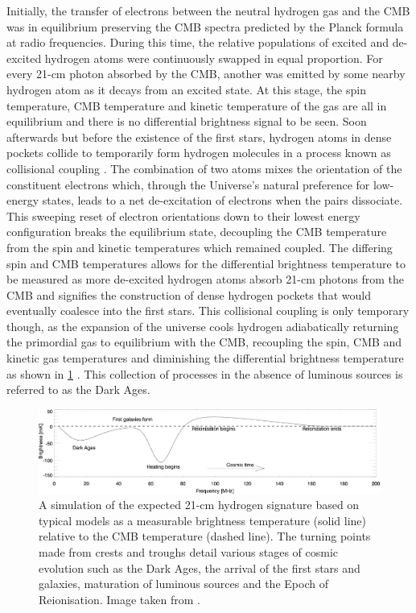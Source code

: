 Initially, the transfer of electrons between the neutral hydrogen gas and the CMB was in equilibrium preserving the CMB spectra predicted by the Planck formula at radio frequencies. During this time, the relative populations of excited and de-excited hydrogen atoms were continuously swapped in equal proportion. For every 21-cm photon absorbed by the CMB, another was emitted by some nearby hydrogen atom as it decays from an excited state. At this stage, the spin temperature, CMB temperature and kinetic temperature of the gas are all in equilibrium and there is no differential brightness signal to be seen. Soon afterwards but before the existence of the first stars, hydrogen atoms in dense pockets collide to temporarily form hydrogen molecules in a process known as collisional coupling \citep{21in21, collisional_coupling}. The combination of two atoms mixes the orientation of the constituent electrons which, through the Universe’s natural preference for low-energy states, leads to a net de-excitation of electrons when the pairs dissociate. This sweeping reset of electron orientations down to their lowest energy configuration breaks the equilibrium state, decoupling the CMB temperature from the spin and kinetic temperatures which remained coupled. The differing spin and CMB temperatures allows for the differential brightness temperature to be measured as more de-excited hydrogen atoms absorb 21-cm photons from the CMB and signifies the construction of dense hydrogen pockets that would eventually coalesce into the first stars. This collisional coupling is only temporary though, as the expansion of the universe cools hydrogen adiabatically returning the primordial gas to equilibrium with the CMB, recoupling the spin, CMB and kinetic gas temperatures and diminishing the differential brightness temperature as shown in \cref{fig:reionisation_hist} \citep{21in21}. This collection of processes in the absence of luminous sources is referred to as the Dark Ages.
\begin{figure}
    \centering
    \includegraphics[width=\textwidth]{21cm_signal}
    \caption{A simulation of the expected 21-cm hydrogen signature based on typical models as a measurable brightness temperature (solid line) relative to the CMB temperature (dashed line). The turning points made from crests and troughs detail various stages of cosmic evolution such as the Dark Ages, the arrival of the first stars and galaxies, maturation of luminous sources and the Epoch of Reionisation. Image taken from \citet{cosmic_signature}.}
    \label{fig:reionisation_hist}
\end{figure}

